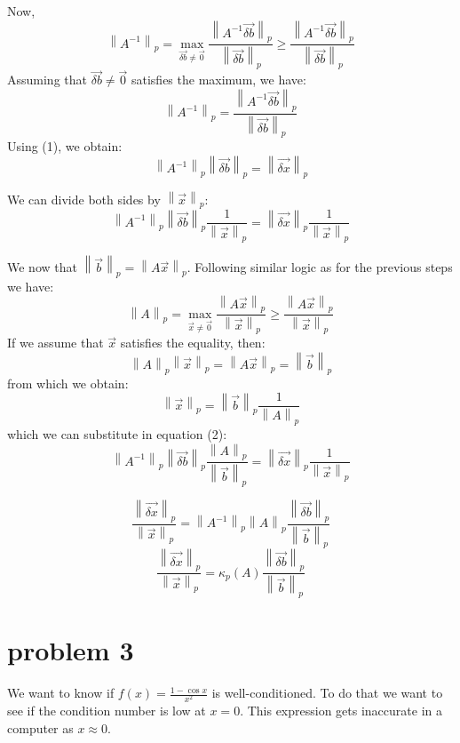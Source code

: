 \documentclass[10pt]{article}
\newcommand{\norm}[1]{\left\lVert#1\right\rVert_p}
\begin{document}
    Now, 
    \[
    \norm{A^{-1}} = \max_{\vec{\delta b}\neq \vec{0}}\frac{\norm{A^{-1}\vec{\delta b}}}{\norm{\vec{\delta b}}} \geq \frac{\norm{A^{-1}\vec{\delta b}}}{\norm{\vec{\delta b}}}
    \]
    Assuming that $\vec{\delta b} \neq \vec{0}$ satisfies the maximum, we have: 
    \[
    \norm{A^{-1}} =\frac{\norm{A^{-1}\vec{\delta b}}}{\norm{\vec{\delta b}}}
      \]
    Using (1), we obtain:
    \[
    \norm{A^{-1}}\norm{\vec{\delta b}} = \norm{\vec{\delta x}}
    \]

    We can divide both sides by $\norm{\vec {x}}$:
    \begin{equation}
    \norm{A^{-1}}\norm{\vec{\delta b}}\frac{1}{\norm{\vec{x}}} = \norm{\vec{\delta x}}\frac{1}{\norm{\vec{x}}}
    \end{equation}

    We now that $\norm{\vec{b}} =\norm{A\vec{x}}$. Following similar
    logic as for the previous steps we have:
    \[
    \norm{A} = \max_{\vec{ x}\neq \vec{0}}\frac{\norm{A\vec{ x}}}{\norm{\vec{x}}} \geq \frac{\norm{A\vec{ x}}}{\norm{\vec{x}}}
    \]
    If we assume that $\vec{x}$ satisfies the equality, then:
    \begin{equation}
      \norm{A}\norm{\vec{x}} = \norm{A\vec{x}} = \norm{\vec{b}}
    \end{equation}
    from which we obtain:
    \[
    \norm{\vec{x}} = \norm{\vec{b}}\frac{1}{\norm{A}}
    \] 
    which we can substitute in equation (2):
    \begin{equation}
    \norm{A^{-1}}\norm{\vec{\delta b}}\frac{\norm{A}}{\norm{\vec{b}}} = \norm{\vec{\delta x}}\frac{1}{\norm{\vec{x}}}
    \end{equation}

    \begin{equation}
 \frac{\norm{\vec{\delta x}}}{\norm{\vec{x}}}=
    \norm{A^{-1}}\norm{A}\frac{\norm{\vec{\delta b}}}{\norm{\vec{b}}} 
    \end{equation}
    \begin{equation}
 \frac{\norm{\vec{\delta x}}}{\norm{\vec{x}}}=
    \kappa_p(A)\frac{\norm{\vec{\delta b}}}{\norm{\vec{b}}} 
    \end{equation}
     
    
\section{problem 3}
 We want to know if $f(x) = \frac{1-\cos x}{x^2}$ is well-conditioned.
 To do that we want to see if the condition number is low at $x=0$. This
 expression gets inaccurate in a computer as $x\approx 0$. 
\end{document}
